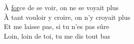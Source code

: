 À \underline{for}ce de se voir, on ne se voyait plus \\
À tant vouloir y croire, on n'y croyait plus \\

Et me laisse pas, si tu n'es pas sûre \\
Loin, loin de toi, tu me dis tout bas
